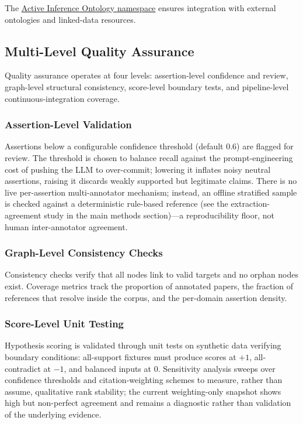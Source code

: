 \documentclass[
  english,
]{article}
\begin{document}
The \href{http://activeinference.institute/ontology/}{Active Inference
Ontology namespace} ensures integration with external ontologies and
linked-data resources.

\subsection{Multi-Level Quality
Assurance}\label{multi-level-quality-assurance}

Quality assurance operates at four levels: assertion-level confidence
and review, graph-level structural consistency, score-level boundary
tests, and pipeline-level continuous-integration coverage.

\subsubsection{Assertion-Level
Validation}\label{assertion-level-validation}

Assertions below a configurable confidence threshold (default 0.6) are
flagged for review. The threshold is chosen to balance recall against
the prompt-engineering cost of pushing the LLM to over-commit; lowering
it inflates noisy neutral assertions, raising it discards weakly
supported but legitimate claims. There is no live per-assertion
multi-annotator mechanism; instead, an offline stratified sample is
checked against a deterministic rule-based reference (see the
extraction-agreement study in the main methods section)---a
reproducibility floor, not human inter-annotator agreement.

\subsubsection{Graph-Level Consistency
Checks}\label{graph-level-consistency-checks}

Consistency checks verify that all nodes link to valid targets and no
orphan nodes exist. Coverage metrics track the proportion of annotated
papers, the fraction of references that resolve inside the corpus, and
the per-domain assertion density.

\subsubsection{Score-Level Unit Testing}\label{score-level-unit-testing}

Hypothesis scoring is validated through unit tests on synthetic data
verifying boundary conditions: all-support fixtures must produce scores
at \(+1\), all-contradict at \(-1\), and balanced inputs at \(0\).
Sensitivity analysis sweeps over confidence thresholds and
citation-weighting schemes to measure, rather than assume, qualitative
rank stability; the current weighting-only snapshot shows high but
non-perfect agreement and remains a diagnostic rather than validation of
the underlying evidence.
\end{document}
